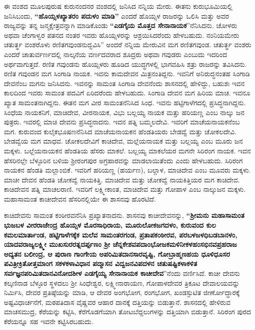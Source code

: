 ಈ ವಂಶದ ಮೂಲಪುರುಷ ಕುರುನಂದನರ ವಂಶದಲ್ಲಿ ಜನಿಸಿದ ನನ್ನಿಯ ಮೇರು. ಈತನು ಕುರುಭೂಮಿಯಲ್ಲಿ ಜನಿಸಿಬಂದು, \textbf{“ಹೊಯ್ಸಳಖ್ಯಾತರಂ ಪದುಳಂ ಮಾಡಿ”} ಎಂದರೆ ಹೊಯ್ಸಳ ರಾಜರನ್ನು ಒಲಿಸಿ ಮತ್ತು ಅವರ ರಾಜ್ಯವನ್ನು ತನ್ನ ಜನ್ಮಕ್ಷೇತ್ರವನ್ನಾಗಿ ಮಾಡಿಕೊಂಡು \textbf{“ಎಡಗೈಯ ಮೊತ್ತದ ಸೇನಾನಾಯಕ}”ನೆನಿಸಿದನು. ಚೋಳರು ಅಥವಾ ಚೆಂಗಾಳ್ವರ ಪತನದ ನಂತರ ಇವರು ಹೊಯ್ಸಳರನ್ನು ಆಶ್ರಯಿಸಿದರೆಂದು ಹೇಳಬಹುದು. ನಂನಿಯಮೇರು ಚತುರ್ತ್ಥ ವಂಶರೊಳು ರಣಿತಗವುಂಡನುದ್ಭವಿಸಿ” ಅಂದರೆ ನನ್ನಿಯ ಮೇರುವಿನ ಮಗ ರಣಿತಗವುಂಡ. ಚತುರ್ತ್ಥ ವಂಶರು ಎಂದರೆ ಚಾತುರ್ವರ್ಣದಲ್ಲಿ ನಾಲ್ಕನೆಯ ವರ್ಣದವರಾದ ಶೂದ್ರರು ಅಥವಾ ಗವುಡರು ಎಂಬುದು ಇದರಿಂದ ಅರ್ಥವಾಗುತ್ತದೆ. ರಣಿತ ಗವುಂಡನು ಹೊಯ್ಸಳರು ಹೂಡಿದ ಯುದ್ಧಗಳಲ್ಲಿ ಭಾಗವಹಿಸಿ ಶತ್ರು ರಾಜರನ್ನು ತವಿಸಿದನು. ರಣಿತ ಗವುಂಡನ ಮಗ ಸಿಂಗಾಡಿ ನಾಯಕ. ಇವನು ಕಾಮದೇವನ ಮಿತ್ರನಂತಿದ್ದನು. ಇವನಿಗೆ ಅನಿರುದ್ಧನಂತಹ ಸಿಂಗಾಡಿ ದೇವನೆಂಬ ಮಗನು ಜನಿಸಿದನು. ಇವನನ್ನು ಸಾಮಂತ ಸಿಂಗಾಡಿ ದೇವನೆಂದು ಶಾಸನದಲ್ಲಿ ಹೇಳಿದ್ದು, ಬಹುಶಃ ಇವನ ಕಾಲದಿಂದ ಇವರು ಸಾಮಂತ ಪದವಿಗೆ ಏರಿದರೆಂದು ಹೇಳಬಹುದು. ಸಿಂಗಾಡಿ ದೇವನ ಮಗ ಹಿರಿಯ ಮಾಚ. ಇವನೂ ಖ್ಯಾತ ಸಾಮಂತನಾಗಿದ್ದನು. ಈತನ ಮಗ ವೀರ ಸಾಮಂತನೆನಿಸಿದ ಸಿಂಧ. ಇವನು ಹಟ್ಟಿಗಾಳೆಗದಲ್ಲಿ ಪ್ರಸಿದ್ಧನಾಗಿದ್ದನು. ಸಿಂಧೆಯ ನಾಯಕನಿಗೆ, ಮಾಚಿದೇವ, ವೀರನಾಯಕ, ವಿಭು ಬಲ್ಲಯ್ಯ ನಾಯಕ ಮತ್ತು ಹರಿಯಣ್ಣ ಎಂಬ ನಾಲ್ಕು ಜನ ಪುತ್ರರು. ಇವರಲ್ಲಿ ಮಾಚಿ ದೇವನು ಪ್ರಸಿದ್ಧನಾದನು. ಇವನ ಪತ್ನಿ ಬಮ್ಮಲದೇವಿ. ಇವರಿಗೆ ಮಾಚೆಯನಾಯಕನೆಂಬ ಮಗ. ಕುರುವಂದ ಕುಲೈಕಭೂಷಣನೆನಿಸಿದ ಮಾಚೆಯನಾಯಕನ ಹೆಂಡತಿಯರು ಬೇಡವ್ವೆ ಮತ್ತು ಚೋಕಲದೇವಿ. ಬೇಡವ್ವೆಯ ಮಗ ಮಾಧವ. ಚೋಕಲದೇವಿಗೆ ಕಾಚಿದೇವ, ಮಲ್ಲೆಯನಾಯಕ ಮತ್ತು ಬಲ್ಲಯ್ಯ ಎಂಬ ಮೂರು ಜನ ಮಕ್ಕಳು. ಬಲ್ಲೆಯನಾಯಕನ ಹೆಂಡತಿಯ ಹೆಸರು ಮಾಕಲೆ. ಬಲ್ಲಯ್ಯ ಮಾಕಲೆಯರ ಮಗನೇ ಸಿರಿರಂಗ ನಾಯಕ. ಇವನ ಹೆಸರಿನಲ್ಲೇ ಬೆಳ್ಳೂರಿನ ಬಳಿಯ ಶ‍್ರೀರಂಗಪುರ ಅಗ್ರಹಾರವನ್ನು ಮಾಡಲಾಯಿತೆಂದು ಎಂದು ಹೇಳಬಹುದು. ಸಿರಿರಂಗ ನಾಯಕನ ಹೆಂಡತಿ ಮಲ್ಲಾಂಬಿಕೆ. ಇವರಿಗೆ ಹರಿಯಣ್ಣ (ಹರ್ಯಣ), ಬಲ್ಲಾಳ, ಮಾಚಿದೇವ ಎಂಬ ಮೂವರು ಮಕ್ಕಳು. ಮಾಚೀ ದೇವನ ಹೆಂಡತಿ ಚೋಕವ್ವೆ ನಾಯಕಿತ್ತಿ. ಮಾಚಿದೇವ ಮತ್ತು ಚೋಕವ್ವೆ ನಾಯಕಿತ್ತಿಯರ ಮಗ ಕಾಚಿದೇವ. ಕಾಚಿದೇವನ ಪತ್ನಿ ಮಾಚಲರಾಣಿ. ಇವರಿಗೆ ಲಕ್ಷ್ಮೀಕಾಂತ, ಮಾಚಿದೇವ ಮತ್ತು ಗೋಪಾಳ ಎಂಬ ನಾಲ್ಕುಜನ ಮಕ್ಕಳು. ಮಹಾಸಾಮಂತ ಕಾಚೀದೇವನ ಹೆಸರಿನಲ್ಲಿಯೇ ಈ ಶಾಸನವು ಹೊರಟಿದೆ.

ಕಾಚಿದೇವನು ಸಾಮಂತ ಕಂಠೀರವನೆನಿಸಿ ಪ್ರಖ್ಯಾತನಾದನು. ಶಾಸನವು ಕಾಚೀದೇವನನ್ನು, \textbf{“ಶ‍್ರೀಮನು ಮಹಾಸಾಮಂತ ಭುಜಬಳ ವೀರರಾಜೇಂದ್ರ ಹೊಯ್ಸಳ ಮೊರಸಾಧಿರಾಯ, ಮೂರುಲೋಕಜಗದಳಂ, ಕುರುವಂದ ಕುಲ ಕಮಲ\-ಮಾರ್ತಾಂಡ, ಹಟ್ಟಿಗಾಳೆಗಕ್ಕೆಕ ಮಲೆವ ಸಾಮಂತರಗಂಡ, ಪ್ರತಾಪಕಂಠೀರವ, ಪರಬಳಜಳಧಿಬಡಬಾನಳಂ, ಯಾದವರಾಜ್ಯ\-ಲಕ್ಷ್ಮೀ ಮುಖಸುರರತ್ನದರ್ಪ್ಪಣಂ ಶ‍್ರೀ ಚೆನ್ನಕೇಶವಪದಾಂಭೋಜಕಮಳಿನೀಕಳಹಂಸಭಿನವಪ್ರಹರಾಜ ಅದ್ಯತನ ಬಲೀಂದ್ರ, ಆ ಪುರಾಣ ಗಾಂಗೇಯ ಅಪರಿಮಿತದಾನಸಾರವೃಷ್ಟಿ, ಗೋಬ್ರಾಹ್ಮಣಹಯ ಧೂಳಿಧೂಸರ ಪವಿತ್ರೀಕ್ರಿತೋತ್ತಮಾಂಗ\general{\break } ಸಕಳಕಳಾವಿಧಾನ ಪದ್ಮಾಸನ ವಿದ್ವಜನವಿಪದಳನ ಚತುಷಷ್ಟಿಕಳಾಕಳಿತ ಸರ್ವಜ್ಞನಪರಿಮಿತದಾನವಿನೋದಶೀಳ ಎಡಗೈಯ್ಯ\general{\break } ಸೇನಾನಾಯಕ ಕಾಚೀದೇವ}”ನೆಂದು ವರ್ಣಿಸಿದೆ. ಕಾಚೀ ದೇವನು ಕಲ್ಕಣಿನಾಡ ಬೆಳ್ಳೂರ ಸ್ಥಳದಲು ಶ‍್ರೀ ಸಿಂಧೇಶ್ವರ, ಲಕ್ಷ್ಮೀನಾರಾಯಣ, ಗೋಪಾಳದೇವರ ತ್ರಿಕೂಟ ದೇವಾಲಯವನ್ನು ನಿರ್ಮಿಸಿ, ದೇವರ ಪ್ರತಿಷ್ಠೆಯನ್ನು ಮಾಡಿ, ಆ ದೇವರ ಅಂಗಭೋಗ, ರಂಗಭೋಗ, ಖಂಡಸ್ಫುಟಿತ ಜೀರ್ಣೋದ್ಧಾರಕ್ಕೆ ಅಷ್ಟವಿಧಾರ್ಚನೆಗೆ, ಮಠಪತಿದಾಸ ವೈಷ್ಣವರ ಆಹಾರ ದಾನಕ್ಕೆ ದತ್ತಿಯನ್ನು ಬಿಡುತ್ತಾನೆ. ಶಾಸನದಲ್ಲಿ ಹೇಳಿರುವ ಮಾಚಸಮುದ್ರ, ಕೆರೆಯನ್ನು ಕಟ್ಟಿಸಿ, ಕೆರೆಗೊಡಗೆಯಾಗಿ ತೋಟ\break ಬೆದ್ದಲುಗಳನ್ನು ದತ್ತಿಯಾಗಿ ಬಿಡುತ್ತಾನೆ. ಸಿರಿರಂಗ ಪುರದ ಕೆರೆಯನ್ನೂ ಸಹ ಇವನೇ ಕಟ್ಟಿಸಿರಬಹುದು.

